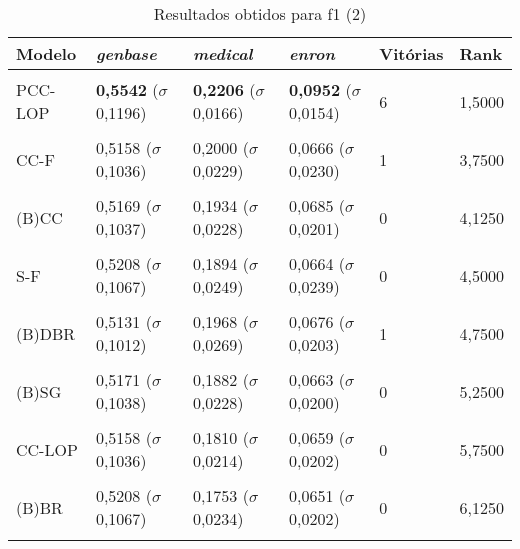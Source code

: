 \begin{table}[htbp]
	\centering
	\caption{Resultados obtidos para f1 (2)}
		\begin{tabular}
        { p{0.88in} p{0.88in} p{0.88in} p{0.88in} p{0.88in} p{0.88in} }
        
        \hline
Modelo & \textit{genbase} & \textit{medical} & \textit{enron} & \textbf{Vitórias} & \textbf{Rank} \\ 
\hline \\

PCC-LOP & \textbf{0,5542} \newline ($\sigma$ 0,1196) & \textbf{0,2206} \newline ($\sigma$ 0,0166) & \textbf{0,0952} \newline ($\sigma$ 0,0154) & 6 & 1,5000 \\ \\
CC-F & 0,5158 \newline ($\sigma$ 0,1036) & 0,2000 \newline ($\sigma$ 0,0229) & 0,0666 \newline ($\sigma$ 0,0230) & 1 & 3,7500 \\ \\
(B)CC & 0,5169 \newline ($\sigma$ 0,1037) & 0,1934 \newline ($\sigma$ 0,0228) & 0,0685 \newline ($\sigma$ 0,0201) & 0 & 4,1250 \\ \\
S-F & 0,5208 \newline ($\sigma$ 0,1067) & 0,1894 \newline ($\sigma$ 0,0249) & 0,0664 \newline ($\sigma$ 0,0239) & 0 & 4,5000 \\ \\
(B)DBR & 0,5131 \newline ($\sigma$ 0,1012) & 0,1968 \newline ($\sigma$ 0,0269) & 0,0676 \newline ($\sigma$ 0,0203) & 1 & 4,7500 \\ \\
(B)SG & 0,5171 \newline ($\sigma$ 0,1038) & 0,1882 \newline ($\sigma$ 0,0228) & 0,0663 \newline ($\sigma$ 0,0200) & 0 & 5,2500 \\ \\
CC-LOP & 0,5158 \newline ($\sigma$ 0,1036) & 0,1810 \newline ($\sigma$ 0,0214) & 0,0659 \newline ($\sigma$ 0,0202) & 0 & 5,7500 \\ \\
(B)BR & 0,5208 \newline ($\sigma$ 0,1067) & 0,1753 \newline ($\sigma$ 0,0234) & 0,0651 \newline ($\sigma$ 0,0202) & 0 & 6,1250 \\ \\


\end{tabular}
\end{table}
